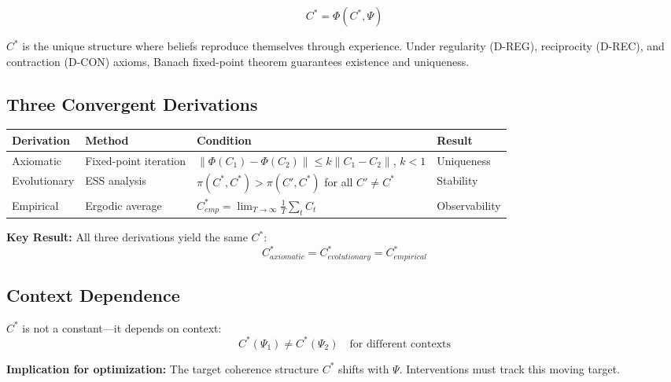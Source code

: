 \begin{equation}
\boxed{
C^* = \Phi(C^*, \Psi)
}
\label{eq:mp-cstar-fixedpoint}
\end{equation}

$C^*$ is the unique structure where beliefs reproduce themselves through experience.
Under regularity (D-REG), reciprocity (D-REC), and contraction (D-CON) axioms,
Banach fixed-point theorem guarantees existence and uniqueness.

\subsection{Three Convergent Derivations}

\begin{center}
\renewcommand{\arraystretch}{1.3}
\begin{tabular}{@{}llll@{}}
\toprule
\textbf{Derivation} & \textbf{Method} & \textbf{Condition} & \textbf{Result} \\
\midrule
Axiomatic & Fixed-point iteration & $\|\Phi(C_1) - \Phi(C_2)\| \leq k\|C_1 - C_2\|$, $k<1$ & Uniqueness \\
Evolutionary & ESS analysis & $\pi(C^*, C^*) > \pi(C', C^*)$ for all $C' \neq C^*$ & Stability \\
Empirical & Ergodic average & $C^*_{emp} = \lim_{T\to\infty} \frac{1}{T}\sum_t C_t$ & Observability \\
\bottomrule
\end{tabular}
\end{center}

\textbf{Key Result:} All three derivations yield the same $C^*$:
\begin{equation}
C^*_{axiomatic} = C^*_{evolutionary} = C^*_{empirical}
\label{eq:mp-cstar-convergence}
\end{equation}

\subsection{Context Dependence}

$C^*$ is not a constant---it depends on context:
\begin{equation}
C^*(\Psi_1) \neq C^*(\Psi_2) \quad \text{for different contexts}
\label{eq:mp-cstar-context}
\end{equation}

\textbf{Implication for optimization:} The target coherence structure $C^*$ shifts with $\Psi$.
Interventions must track this moving target.

